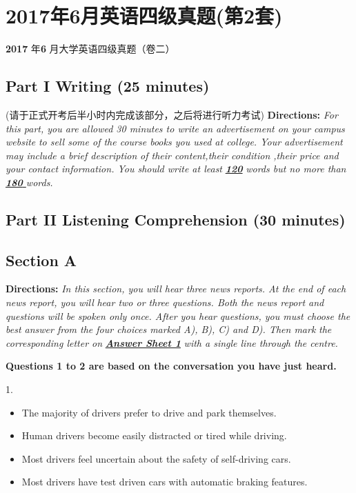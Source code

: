 \documentclass[UTF8,11pt]{ctexart}
\begin{document}
\section*{2017年6月英语四级真题(第2套)}
\textbf{2017} 年\textbf{6} 月大学英语四级真题（卷二）


\subsection*{\textbf{Part I} \textbf{Writing} \textbf{(25 minutes)}}


(请于正式开考后半小时内完成该部分，之后将进行听力考试) \textbf{Directions:}\textit{ For this part, you are allowed 30 minutes to write an advertisement on your campus website} \textit{to sell some of the course books you used at college. Your advertisement may include a brief description} \textit{of their content,their condition ,their price and your contact information. You should write at least}\textbf{\textit{ }}\textbf{\textit{\uline{120}}} \textit{words but no more than}\textbf{\textit{ }}\textbf{\textit{\uline{180}}}\textit{\uline{ }}\textit{words.}


\subsection*{\textbf{Part II} \textbf{Listening Comprehension} \textbf{(30 minutes)}}


\subsection*{\textbf{Section A}}


\textbf{Directions:}\textit{ In this section, you will hear three news reports. At the end of each news report, you will} \textit{hear two or three questions. Both the news report and questions will be spoken only once. After you hear} \textit{questions, you must choose the best answer from the four choices marked A), B), C) and D). Then mark} \textit{the corresponding letter on}\textbf{\textit{ }}\textbf{\textit{\uline{Answer Sheet 1}}}\textit{ with a single line through the centre.}


\textbf{Questions 1 to 2 are based on the conversation you have just heard.}


1.


\begin{itemize}[leftmargin=2em,itemsep=.2em,topsep=.4em]\item[A.] The majority of drivers prefer to drive and park themselves.
\item[B.] Human drivers become easily distracted or tired while driving.
\item[C.] Most drivers feel uncertain about the safety of self-driving cars.
\item[D.] Most drivers have test driven cars with automatic braking features.
\end{itemize}
\end{document}

